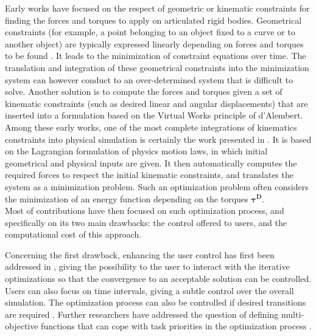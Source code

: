 				\label{subsubsubsubsec:CA_MC_Physics_Constraints}

Early works have focused on the respect of geometric or kinematic constraints for finding the forces and torques to apply on articulated rigid bodies. Geometrical constraints (for example, a point belonging to an object fixed to a curve or to another object) are typically expressed linearly depending on forces and torques to be found . It leads to the minimization of constraint equations over time. The translation and integration of these geometrical constraints into the minimization system can however conduct to an over-determined system that is difficult to solve. Another solution  is to compute the forces and torques given a set of kinematic constraints (such as desired linear and angular displacements) that are inserted into a formulation based on the Virtual Works principle of d'Alembert. Among these early works, one of the most complete integrations of kinematics constraints into physical simulation is certainly the work presented in . It is based on the Lagrangian formulation of physics motion laws, in which initial geometrical and physical inputs are given. It then automatically computes the required forces to respect the initial kinematic constraints, and translates the system as a minimization problem. Such an optimization problem often considers the minimization of an energy function depending on the torques $\boldsymbol{\tau^D}$.\\

Most of contributions have then focused on such optimization process, and specifically on its two main drawbacks: the control offered to users, and the computational cost of this approach. 

Concerning the first drawback, enhancing the user control has first been addressed in , giving the possibility to the user to interact with the iterative optimizations so that the convergence to an acceptable solution can be controlled. Users can also focus on time intervals, giving a subtle control over the overall simulation. The optimization process can also be controlled if desired transitions are required . Further researchers have addressed the question of defining multi-objective functions that can cope with task priorities in the optimization process .

